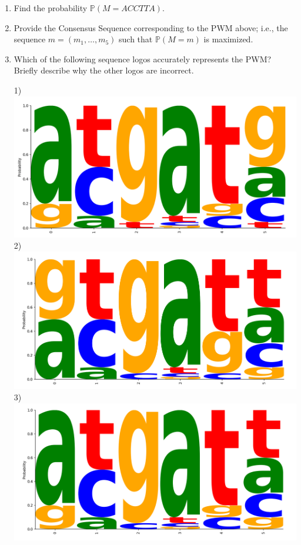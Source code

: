 \begin{enumerate}

\item Find the probability $\mathbb P(M = ACCTTA)$.

\begin{solution}

\end{solution}

\item  Provide the Consensus Sequence corresponding to the PWM above; i.e., the sequence $m = (m_1, \dots, m_5)$ such that $\mathbb P(M = m)$ is maximized.

\begin{solution}

\end{solution}

\item
Which of the following sequence logos accurately represents the PWM? Briefly describe why the other logos are incorrect.

1) \includegraphics[scale=.2]{figures/logo_1.png} \\
2) \includegraphics[scale=.2]{figures/logo_2.png} \\
3) \includegraphics[scale=.2]{figures/logo_3.png}


\end{enumerate}
